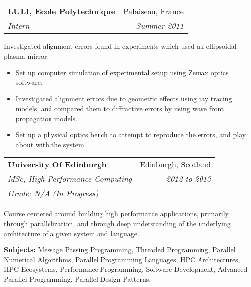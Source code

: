 \documentclass[11pt]{article}
\makeatletter
\newcommand{\resumeSection}[1]{
    \par
    \vspace{\baselineskip}
    \large {\sc {#1}}
    \par
    \vspace{-0.9\baselineskip}
    \hrulefill
    \vspace{0.5\baselineskip}
    \par
}
\newenvironment{resumeSubSectionHeader}{
    \par
    \begin{tabular*}{\textwidth}{l@{\extracolsep{\fill}}r}
    \par
} {
    \end{tabular*}
    \par
}
\newenvironment{resumeSubSectionBody}{
    \par
    \vspace{-0.8\parskip}
    \begin{small}
    \par
} {
    \par
    \end{small}
    \par
}
\makeatother
\begin{document}
%
%
\begin{resumeSubSectionHeader}

    \textbf{LULI, Ecole Polytechnique} & Palaiseau, France \\
    \emph{Intern}                      & \emph{Summer 2011}

\end{resumeSubSectionHeader}
\begin{resumeSubSectionBody}

    Investigated alignment errors found in experiments which used an
    ellipsoidal plasma mirror.

    \begin{itemize}
        \item
            Set up computer simulation of experimental setup using
            Zemax optics software.

        \item
            Investigated alignment errors due to geometric effects
            using ray tracing models, and compared them
            to diffractive errors by using wave front propagation models.

        \item
            Set up a physical optics bench to attempt to reproduce the
            errors, and play about with the system.
    \end{itemize}

\end{resumeSubSectionBody}


\resumeSection{Education \& Training}


%
%
\begin{resumeSubSectionHeader}

    \textbf{University Of Edinburgh}       & Edinburgh, Scotland\\
    \emph{MSc, High Performance Computing} & \emph{2012 to 2013} \\
    \emph{Grade: N/A (In Progress)}

\end{resumeSubSectionHeader}
\begin{resumeSubSectionBody}

    Course centered around building high performance applications,
    primarily through parallelization, and through deep understanding
    of the underlying architecture of a given system and language.

    \begin{description}
        \item{\bf Subjects:}
            Message Passing Programming, Threaded Programming,
            Parallel Numerical Algorithms,
            Parallel Programming Languages, HPC Architectures,
            HPC Ecosystems, Performance Programming,
            Software Development, Advanced Parallel Programming,
            Parallel Design Patterns.
    \end{description}

\end{resumeSubSectionBody}
\end{document}
